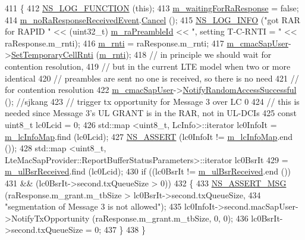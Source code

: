 \begin{DoxyCode}
411 \{
412   \hyperlink{log-macros-disabled_8h_a90b90d5bad1f39cb1b64923ea94c0761}{NS\_LOG\_FUNCTION} (\textcolor{keyword}{this});
413   \hyperlink{classns3_1_1LteUeMac_ad31e6d5654f49c13d6f5614922e97288}{m\_waitingForRaResponse} = \textcolor{keyword}{false};
414   \hyperlink{classns3_1_1LteUeMac_a5240ec3060b71b9a55e406319d026869}{m\_noRaResponseReceivedEvent}.\hyperlink{classns3_1_1EventId_a993ae94e48e014e1afd47edb16db7a11}{Cancel} ();
415   \hyperlink{group__logging_gafbd73ee2cf9f26b319f49086d8e860fb}{NS\_LOG\_INFO} (\textcolor{stringliteral}{"got RAR for RAPID "} << (uint32\_t) \hyperlink{classns3_1_1LteUeMac_a80808b971b1fb38d1d41ef34811a0252}{m\_raPreambleId} << \textcolor{stringliteral}{", setting
       T-C-RNTI = "} << raResponse.m\_rnti);
416   \hyperlink{classns3_1_1LteUeMac_a95e386ad717fad6e09de8c139fe0ca89}{m\_rnti} = raResponse.m\_rnti;
417   \hyperlink{classns3_1_1LteUeMac_ac4ed6a7b40912e92cf93c79e36807b8d}{m\_cmacSapUser}->\hyperlink{classns3_1_1LteUeCmacSapUser_ad094e1492ca1603efa22398ba854af77}{SetTemporaryCellRnti} (\hyperlink{classns3_1_1LteUeMac_a95e386ad717fad6e09de8c139fe0ca89}{m\_rnti});
418   \textcolor{comment}{// in principle we should wait for contention resolution,}
419   \textcolor{comment}{// but in the current LTE model when two or more identical}
420   \textcolor{comment}{// preambles are sent no one is received, so there is no need}
421   \textcolor{comment}{// for contention resolution}
422   \hyperlink{classns3_1_1LteUeMac_ac4ed6a7b40912e92cf93c79e36807b8d}{m\_cmacSapUser}->\hyperlink{classns3_1_1LteUeCmacSapUser_a697ea79347ad5d2ff5e136240255b8e0}{NotifyRandomAccessSuccessful} (); \textcolor{comment}{//sjkang}
423   \textcolor{comment}{// trigger tx opportunity for Message 3 over LC 0}
424   \textcolor{comment}{// this is needed since Message 3's UL GRANT is in the RAR, not in UL-DCIs}
425   \textcolor{keyword}{const} uint8\_t lc0Lcid = 0;
426   std::map <uint8\_t, LcInfo>::iterator lc0InfoIt = \hyperlink{classns3_1_1LteUeMac_af4d5b382d725f5e2fbf18dcdb60401ed}{m\_lcInfoMap}.find (lc0Lcid);
427   \hyperlink{assert_8h_a6dccdb0de9b252f60088ce281c49d052}{NS\_ASSERT} (lc0InfoIt != \hyperlink{classns3_1_1LteUeMac_af4d5b382d725f5e2fbf18dcdb60401ed}{m\_lcInfoMap}.end ());
428   std::map <uint8\_t, LteMacSapProvider::ReportBufferStatusParameters>::iterator lc0BsrIt
429     = \hyperlink{classns3_1_1LteUeMac_ab1de37ecba7b76c9de1dd81bf49ac66d}{m\_ulBsrReceived}.find (lc0Lcid);
430   \textcolor{keywordflow}{if} ((lc0BsrIt != \hyperlink{classns3_1_1LteUeMac_ab1de37ecba7b76c9de1dd81bf49ac66d}{m\_ulBsrReceived}.end ())
431       && (lc0BsrIt->second.txQueueSize > 0))
432     \{
433       \hyperlink{assert_8h_aff5ece9066c74e681e74999856f08539}{NS\_ASSERT\_MSG} (raResponse.m\_grant.m\_tbSize > lc0BsrIt->second.txQueueSize, 
434                      \textcolor{stringliteral}{"segmentation of Message 3 is not allowed"});
435       lc0InfoIt->second.macSapUser->NotifyTxOpportunity (raResponse.m\_grant.m\_tbSize, 0, 0); 
436       lc0BsrIt->second.txQueueSize = 0;
437     \}
438 \}
\end{DoxyCode}



